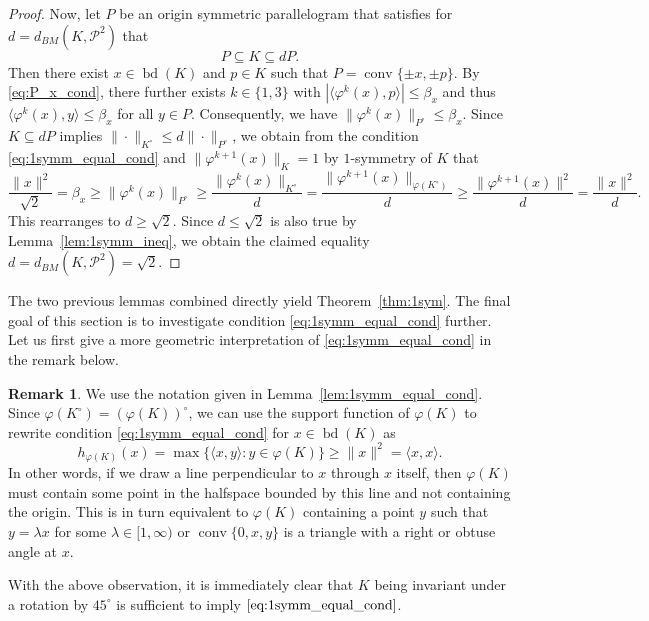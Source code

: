 \documentclass[12pt,a4paper]{article}
\theoremstyle{definition}
\newtheorem{remark}[twr]{Remark}
\DeclareMathOperator{\conv}{conv}
\DeclareMathOperator{\bd}{bd}
\newcommand\CP{\mathcal{P}}
\begin{document}
\begin{proof}
Now, let $P$ be an origin symmetric parallelogram that satisfies for $d = d_{BM}(K, \CP^2)$ that
$$ P \subseteq K \subseteq d P. $$
Then there exist $x \in \bd(K)$ and $p \in K$ such that $P = \conv\{ \pm x, \pm p \}$. By \eqref{eq:P_x_cond}, there further exists $k \in \{1,3\}$ with $|\langle \varphi^k(x), p \rangle| \leq \beta_x$ and thus $\langle \varphi^k(x), y \rangle \leq \beta_x$ for all $y \in P$. Consequently, we have $\|\varphi^k(x)\|_{P^\circ} \leq \beta_x$. Since $K \subseteq d P$ implies $\| \cdot \|_{K^\circ} \leq d \| \cdot \|_{P^\circ}$, we obtain from the condition \eqref{eq:1symm_equal_cond} and $\|\varphi^{k+1}(x)\|_K = 1$ by $1$-symmetry of $K$ that
$$ \frac{\|x\|^2}{\sqrt{2}} = \beta_x \geq \| \varphi^k(x) \|_{P^\circ} \geq \frac{\| \varphi^k(x) \|_{K^\circ}}{d} = \frac{\| \varphi^{k+1}(x) \|_{\varphi(K^\circ)}}{d} \geq \frac{\| \varphi^{k+1}(x) \|^2}{d} = \frac{\|x\|^2}{d}. $$
This rearranges to $d \geq \sqrt{2}$. Since $d \leq \sqrt{2}$ is also true by Lemma~\ref{lem:1symm_ineq}, we obtain the claimed equality $d=d_{BM}(K,\CP^2) = \sqrt{2}$.
\end{proof}



The two previous lemmas combined directly yield Theorem~\ref{thm:1sym}. The final goal of this section is to investigate condition \eqref{eq:1symm_equal_cond} further. Let us first give a more geometric interpretation of \eqref{eq:1symm_equal_cond} in the remark below.



\begin{remark}
\label{rem:1symm_cond}
We use the notation given in Lemma~\ref{lem:1symm_equal_cond}. Since $\varphi(K^\circ) = (\varphi(K))^\circ$, we can use the support function of $\varphi(K)$ to rewrite condition \eqref{eq:1symm_equal_cond} for $x \in \bd(K)$ as
$$ h_{\varphi(K)}(x) = \max \{ \langle x, y \rangle : y \in \varphi(K) \} \geq \| x \|^2 = \langle x, x \rangle. $$
In other words, if we draw a line perpendicular to $x$ through $x$ itself, then $\varphi(K)$ must contain some point in the halfspace bounded by this line and not containing the origin. This is in turn equivalent to $\varphi(K)$ containing a point $y$ such that $y = \lambda x$ for some $\lambda \in [1,\infty)$ or $\conv\{0,x,y\}$ is a triangle with a right or obtuse angle at $x$.
\end{remark}



With the above observation, it is immediately clear that $K$ being invariant under a rotation by $45^\circ$ is sufficient to imply $\eqref{eq:1symm_equal_cond}$. 
\end{document}
